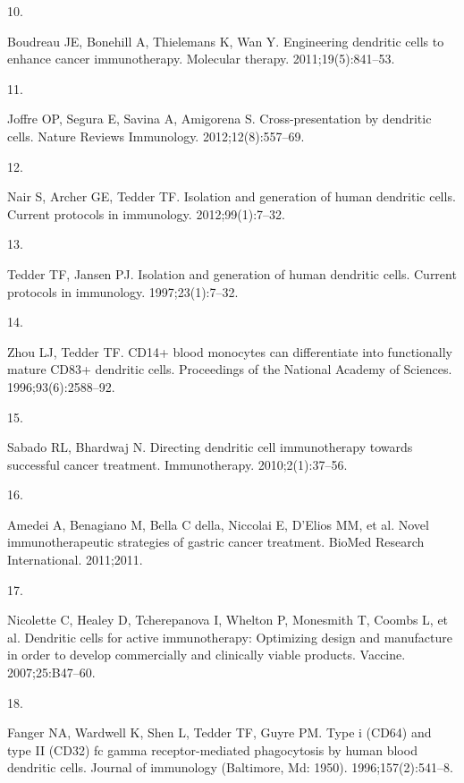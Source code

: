 \documentclass[
]{article}
\newlength{\cslhangindent}
\newlength{\csllabelwidth}
\newenvironment{CSLReferences}[2] %
 {\begin{list}{}{%
  \setlength{\itemindent}{0pt}
  \setlength{\leftmargin}{0pt}
  \setlength{\parsep}{0pt}
  \ifodd #1
   \setlength{\leftmargin}{\cslhangindent}
   \setlength{\itemindent}{-1\cslhangindent}
  \fi
  \setlength{\itemsep}{#2\baselineskip}}}
 {\end{list}}
\newcommand{\CSLLeftMargin}[1]{\parbox[t]{\csllabelwidth}{\strut#1\strut}}
\newcommand{\CSLRightInline}[1]{\parbox[t]{\linewidth - \csllabelwidth}{\strut#1\strut}}
\begin{document}
\begin{CSLReferences}{0}{1}
\CSLLeftMargin{10. }%
\CSLRightInline{Boudreau JE, Bonehill A, Thielemans K, Wan Y.
Engineering dendritic cells to enhance cancer immunotherapy. Molecular
therapy. 2011;19(5):841--53. }

\CSLLeftMargin{11. }%
\CSLRightInline{Joffre OP, Segura E, Savina A, Amigorena S.
Cross-presentation by dendritic cells. Nature Reviews Immunology.
2012;12(8):557--69. }

\CSLLeftMargin{12. }%
\CSLRightInline{Nair S, Archer GE, Tedder TF. Isolation and generation
of human dendritic cells. Current protocols in immunology.
2012;99(1):7--32. }

\CSLLeftMargin{13. }%
\CSLRightInline{Tedder TF, Jansen PJ. Isolation and generation of human
dendritic cells. Current protocols in immunology. 1997;23(1):7--32. }

\CSLLeftMargin{14. }%
\CSLRightInline{Zhou LJ, Tedder TF. CD14+ blood monocytes can
differentiate into functionally mature CD83+ dendritic cells.
Proceedings of the National Academy of Sciences. 1996;93(6):2588--92. }

\CSLLeftMargin{15. }%
\CSLRightInline{Sabado RL, Bhardwaj N. Directing dendritic cell
immunotherapy towards successful cancer treatment. Immunotherapy.
2010;2(1):37--56. }

\CSLLeftMargin{16. }%
\CSLRightInline{Amedei A, Benagiano M, Bella C della, Niccolai E,
D'Elios MM, et al. Novel immunotherapeutic strategies of gastric cancer
treatment. BioMed Research International. 2011;2011. }

\CSLLeftMargin{17. }%
\CSLRightInline{Nicolette C, Healey D, Tcherepanova I, Whelton P,
Monesmith T, Coombs L, et al. Dendritic cells for active immunotherapy:
Optimizing design and manufacture in order to develop commercially and
clinically viable products. Vaccine. 2007;25:B47--60. }

\CSLLeftMargin{18. }%
\CSLRightInline{Fanger NA, Wardwell K, Shen L, Tedder TF, Guyre PM. Type
i (CD64) and type II (CD32) fc gamma receptor-mediated phagocytosis by
human blood dendritic cells. Journal of immunology (Baltimore, Md:
1950). 1996;157(2):541--8. }


\end{CSLReferences}
\end{document}
